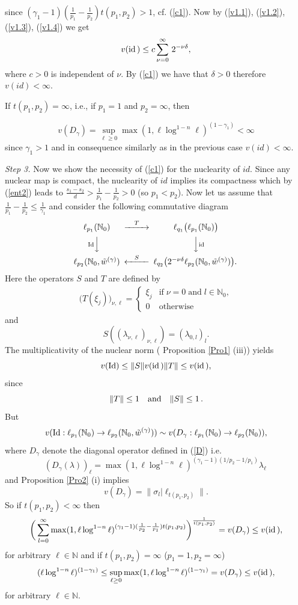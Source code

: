 \documentclass[12pt]{article}
\def\id{\mathop{\rm id \,}\nolimits}
\def\Id{\mathop{\rm Id}\nolimits}
\newcommand{\N}{{\mathbb N}}
\begin{document}
since $(\gamma_1-1)(\frac{1}{p_1}-\frac{1}{p_2})t(p_1,p_2)>1$, cf. (\ref{c1}). Now by (\ref{v1.1}), (\ref{v1.2}), (\ref{v1.3}), (\ref{v1.4}) we get
$$
v(\id) \leq c\sum_{\nu=0}^\infty \,2^{-\nu\delta},
$$
where $c>0$ is independent of $\nu$. By (\ref{c1}) we have that  $\delta>0$ therefore 
$v(id)<\infty$.

If $t(p_1,p_2)=\infty$, i.e., if $p_1=1$ and $p_2=\infty$, then


 $$v(D_\gamma)=\sup_{\ell\geq 0}\max(1,\ell\log^{1-n}\ell)^{(1-\gamma_1)}<\infty$$
since  $\gamma_1>1$  and in consequence similarly as in the previous case $v(id)<\infty$.

{\em Step 3.} 
Now we show the necessity of (\ref{c1}) for the nuclearity of $id$. Since any nuclear map is compact, the nuclearity of $id$ implies its compactness which by (\ref{ent2}) leads to 
$ \frac{s_1 - s_2}{d}> \frac{1}{p_1}- \frac{1}{p_2}>0$ (so $p_1<p_2$).
Now let us assume that $\frac{1}{p_1}- \frac{1}{p_2}\leq  \frac{1}{\gamma_{1}}$ and  consider the following commutative diagram
\begin{equation}\nonumber
\begin{CD}
\ell_{p_1}(\N_0)@>{T}>>\ell_{q_1}\big(\ell_{p_1}(\N_0)\big)\\
@V{\Id}VV@VV{\id}V\\
\ell_{p_2}(\N_0,\tilde{w}^{(\gamma)}) @<{S}<<\ell_{q_2}\big(2^{-\nu\delta}\ell_{p_2}(\N_0, \tilde{w}^{(\gamma)})\big).\,
\end{CD}
\end{equation}
Here the operators $S$ and $T$ are defined by  
\begin{align*}
\big(T(\xi_j)\big)_{\nu,\ell} = 
\begin{cases} 
\xi_j  & \text{if}\;  \nu=0 \;\text{and}\;  l \in\N_0 ,\\
0  &\text{otherwise} 
\end{cases}
\end{align*}
and
$$
S((\lambda_{\nu,\ell})_{\nu,\ell} ) = (\lambda_{0,l})_l. 
$$
The multiplicativity of the nuclear norm ( Proposition \ref{Pro1} (iii)) yields
$$
   v(\Id) \leq \|S\|v(\id) \|T\| \le v(\id),
$$
since  
$$
\|T\| \leq 1    \quad {\rm and } \quad   \|S\| \leq 1 \, .
$$
But
$$
v(\Id: \ell_{p_1}(\N_0)\rightarrow \ell_{p_2}(\N_0,\tilde{w}^{(\gamma)}))\sim  v(D_\gamma:\ell_{p_1}(\N_0)\rightarrow \ell_{p_2}(\N_0)),
$$
where $ D_\gamma$ denote the diagonal operator defined in (\ref{D}) i.e.
$$
(D_\gamma(\lambda))_\ell = \max(1,\ell\log^{1-n}\ell)^{(\gamma_1 - 1)(1/p_2-1/p_1)} \lambda_\ell\, 
$$ 
and Proposition \ref{Pro2} (i) implies
$$v(D_\gamma)= \|\sigma_l |\ell_{t(p_1,p_2)}\|.$$
So if $t(p_1,p_2)<\infty$ then 
\begin{equation}
\label{nr1}
\bigg(\sum_{l=0}^\infty \max(1,\ell\log^{1-n}\ell)^{(\gamma_1-1)(\frac{1}{p_2}-\frac{1}{p_1})t(p_1,p_2)}\bigg)^{\frac{1}{t(p_1,p_2)}}= v(D_\gamma)\leq v(\id),
\end{equation}
for arbitrary $\ell\in\N$ and
 if $t(p_1,p_2)=\infty$ ($p_1=1, p_2=\infty$)
\begin{equation}
\label{nr2}
(\ell\log^{1-n}\ell)^{(1-\gamma_1)}\leq\sup_{\ell\geq 0}\max(1,\ell\log^{1-n}\ell)^{(1-\gamma_1)}= v(D_\gamma)\le  v (\id),
\end{equation}
for arbitrary $\ell\in\N$. 
\end{document}
